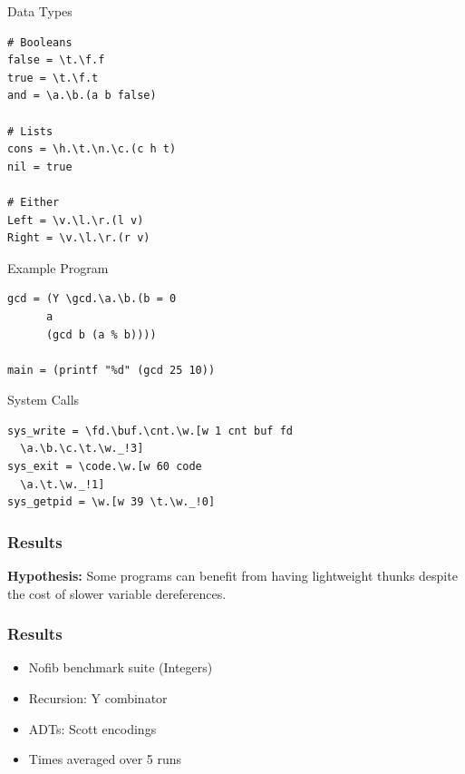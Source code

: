 \documentclass[14pt,mathserif]{beamer}
\begin{document}
\begin{frame}[fragile]{Data Types} 
\vspace{-0.5cm}
\small
\begin{lstlisting}
# Booleans
false = \t.\f.f
true = \t.\f.t
and = \a.\b.(a b false)

# Lists
cons = \h.\t.\n.\c.(c h t)
nil = true

# Either 
Left = \v.\l.\r.(l v)
Right = \v.\l.\r.(r v)
\end{lstlisting}
\end{frame}

\begin{frame}[fragile]{Example Program}
\small
\begin{lstlisting}
gcd = (Y \gcd.\a.\b.(b = 0 
      a 
      (gcd b (a % b))))

main = (printf "%d" (gcd 25 10))
\end{lstlisting}
\end{frame}

\begin{frame}[fragile]{System Calls}
\small
\begin{lstlisting}
sys_write = \fd.\buf.\cnt.\w.[w 1 cnt buf fd 
  \a.\b.\c.\t.\w._!3]
sys_exit = \code.\w.[w 60 code 
  \a.\t.\w._!1]
sys_getpid = \w.[w 39 \t.\w._!0]
\end{lstlisting}
\end{frame}

\begin{frame}[fragile]
\frametitle{Results}
\centering
\textbf{Hypothesis:} Some programs can benefit from having lightweight thunks
despite the cost of slower variable dereferences.
\end{frame}

\begin{frame}
\frametitle{Results}
\begin{itemize}
\item Nofib benchmark suite (Integers)
\item Recursion: Y combinator
\item ADTs: Scott encodings
\item Times averaged over 5 runs
\end{itemize}
\end{frame}

\end{document}
